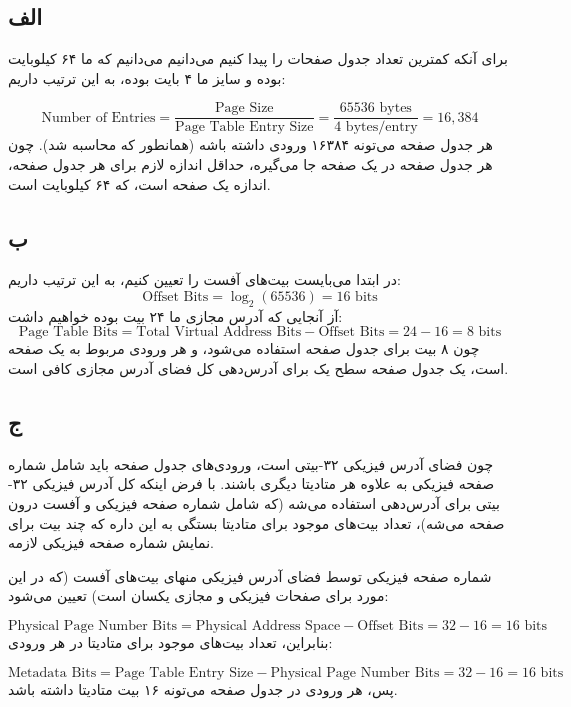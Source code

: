 \subsection*{الف}
برای آنکه کمترین تعداد جدول صفحات را پیدا کنیم می‌دانیم می‌دانیم که
ما ۶۴ کیلوبایت بوده و سایز
ما ۴ بایت بوده، به این ترتیب داریم:

\[ 
    \text{Number of Entries} = \frac{\text{Page Size}}{\text{Page Table Entry Size}} = \frac{65536 \text{ bytes}}{4 \text{ bytes/entry}} = 16,384
\]
هر جدول صفحه می‌تونه ۱۶۳۸۴ ورودی داشته باشه (همانطور که محاسبه شد). چون هر جدول صفحه در یک صفحه جا می‌گیره، حداقل اندازه لازم برای هر جدول صفحه، اندازه یک صفحه است، که ۶۴ کیلوبایت است.

\subsection*{ب}
در ابتدا می‌بایست بیت‌های آفست را تعیین کنیم، به این ترتیب داریم:
\[ 
    \text{Offset Bits} = \log_2(65536) = 16 \text{ bits} 
\]
آز آنجایی که آدرس مجازی ما ۲۴ بیت بوده خواهیم داشت:
\[ 
    \text{Page Table Bits} = \text{Total Virtual Address Bits} - \text{Offset Bits} = 24 - 16 = 8 \text{ bits} 
\]
چون ۸ بیت برای جدول صفحه استفاده می‌شود، و هر ورودی مربوط به یک صفحه است، یک جدول صفحه سطح یک برای آدرس‌دهی کل فضای آدرس مجازی کافی است.

\subsection*{ج}
چون فضای آدرس فیزیکی ۳۲-بیتی است، ورودی‌های جدول صفحه باید شامل شماره صفحه فیزیکی به علاوه هر متادیتا دیگری باشند. با فرض اینکه کل آدرس فیزیکی ۳۲-بیتی برای آدرس‌دهی استفاده می‌شه (که شامل شماره صفحه فیزیکی و آفست درون صفحه می‌شه)، تعداد بیت‌های موجود برای متادیتا بستگی به این داره که چند بیت برای نمایش شماره صفحه فیزیکی لازمه.

شماره صفحه فیزیکی توسط فضای آدرس فیزیکی منهای بیت‌های آفست (که در این مورد برای صفحات فیزیکی و مجازی یکسان است) تعیین می‌شود:

\[ 
    \text{Physical Page Number Bits} = \text{Physical Address Space} - \text{Offset Bits} = 32 - 16 = 16 \text{ bits} 
\]
بنابراین، تعداد بیت‌های موجود برای متادیتا در هر ورودی:

\[ 
    \text{Metadata Bits} = \text{Page Table Entry Size} - \text{Physical Page Number Bits} = 32 - 16 = 16 \text{ bits} 
\]
پس، هر ورودی در جدول صفحه می‌تونه ۱۶ بیت متادیتا داشته باشد.